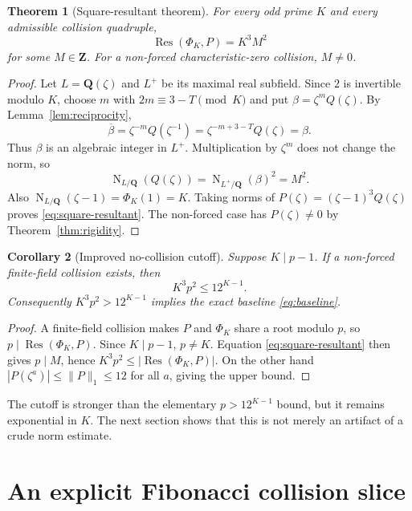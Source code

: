 \documentclass[11pt]{article}
\newtheorem{theorem}{Theorem}[section]
\newtheorem{corollary}[theorem]{Corollary}
\newcommand{\Q}{\mathbf Q}
\newcommand{\Res}{\operatorname{Res}}
\newcommand{\Norm}{\operatorname{N}}
\begin{document}
\begin{theorem}[Square-resultant theorem]\label{thm:square-resultant}
For every odd prime $K$ and every admissible collision quadruple,
\begin{equation}\label{eq:square-resultant}
\Res(\Phi_K,P)=K^3M^2
\end{equation}
for some $M\in\mathbf Z$.  For a non-forced characteristic-zero collision,
$M\ne0$.
\end{theorem}

\begin{proof}
Let $L=\Q(\zeta)$ and $L^+$ be its maximal real subfield.  Since $2$ is
invertible modulo $K$, choose $m$ with
$2m\equiv3-T\pmod K$ and put
$\beta=\zeta^mQ(\zeta)$.  By
Lemma~\ref{lem:reciprocity},
\[
\overline\beta=\zeta^{-m}Q(\zeta^{-1})
=\zeta^{-m+3-T}Q(\zeta)=\beta.
\]
Thus $\beta$ is an algebraic integer in $L^+$.  Multiplication by $\zeta^m$
does not change the norm, so
\[
\Norm_{L/\Q}(Q(\zeta))
=\Norm_{L^+/\Q}(\beta)^2=M^2.
\]
Also
$\Norm_{L/\Q}(\zeta-1)=\Phi_K(1)=K$.  Taking norms of
$P(\zeta)=(\zeta-1)^3Q(\zeta)$ proves \eqref{eq:square-resultant}.
The non-forced case has $P(\zeta)\ne0$ by
Theorem~\ref{thm:rigidity}.
\end{proof}

\begin{corollary}[Improved no-collision cutoff]\label{cor:cutoff}
Suppose $K\mid p-1$.  If a non-forced finite-field collision exists, then
\begin{equation}\label{eq:cutoff}
K^3p^2\le 12^{K-1}.
\end{equation}
Consequently $K^3p^2>12^{K-1}$ implies the exact baseline
\eqref{eq:baseline}.
\end{corollary}

\begin{proof}
A finite-field collision makes $P$ and $\Phi_K$ share a root modulo $p$, so
$p\mid\Res(\Phi_K,P)$.  Since $K\mid p-1$, $p\ne K$.  Equation
\eqref{eq:square-resultant} then gives $p\mid M$, hence
$K^3p^2\le|\Res(\Phi_K,P)|$.  On the other hand
$|P(\zeta^a)|\le\|P\|_1\le12$ for all $a$, giving the upper bound.
\end{proof}

The cutoff is stronger than the elementary $p>12^{K-1}$ bound, but it remains
exponential in $K$.  The next section shows that this is not merely an artifact
of a crude norm estimate.

\section{An explicit Fibonacci collision slice}
\end{document}
